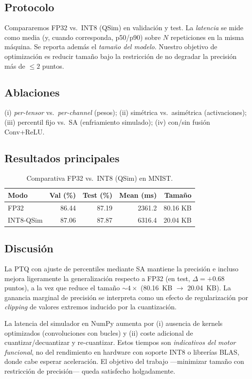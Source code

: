 \subsection*{Protocolo}
Compararemos FP32 vs.\ INT8 (QSim) en validación y test. La \emph{latencia} se mide como media (y, cuando corresponda, p50/p90) sobre $N$ repeticiones en la misma máquina. Se reporta además el \emph{tamaño del modelo}. Nuestro objetivo de optimización es reducir tamaño bajo la restricción de no degradar la precisión más de $\leq 2$ puntos.

\subsection*{Ablaciones}
(i) \emph{per-tensor} vs.\ \emph{per-channel} (pesos); (ii) simétrica vs.\ asimétrica (activaciones); (iii) percentil fijo vs.\ SA (enfriamiento simulado); (iv) con/sin fusión Conv+ReLU.

\subsection*{Resultados principales}

\begin{table}[H]
\centering
\caption{Comparativa FP32 vs.\ INT8 (QSim) en MNIST.}
\begin{tabular}{lrrrr}
\toprule
Modo & Val (\%) & Test (\%) & Mean (ms) & Tamaño \\
\midrule
FP32      & 86.44 & 87.19 & 2361.2 & 80.16 KB \\
INT8-QSim & 87.06 & 87.87 & 6316.4 & 20.04 KB \\
\bottomrule
\end{tabular}
\end{table}

\FloatBarrier

\subsection*{Discusión}
La PTQ con ajuste de percentiles mediante SA mantiene la precisión e incluso mejora ligeramente la generalización respecto a FP32 (en test, $\Delta=+0.68$ puntos), a la vez que reduce el tamaño $\sim 4\times$ (80.16~KB $\rightarrow$ 20.04~KB). La ganancia marginal de precisión se interpreta como un efecto de regularización por \emph{clipping} de valores extremos inducido por la cuantización.

La latencia del simulador en NumPy aumenta por (i) ausencia de kernels optimizados (convoluciones con bucles) y (ii) coste adicional de cuantizar/decuantizar y re-cuantizar. Estos tiempos son \emph{indicativos del motor funcional}, no del rendimiento en hardware con soporte INT8 o librerías BLAS, donde cabe esperar aceleración. El objetivo del trabajo —minimizar tamaño con restricción de precisión— queda satisfecho holgadamente.

